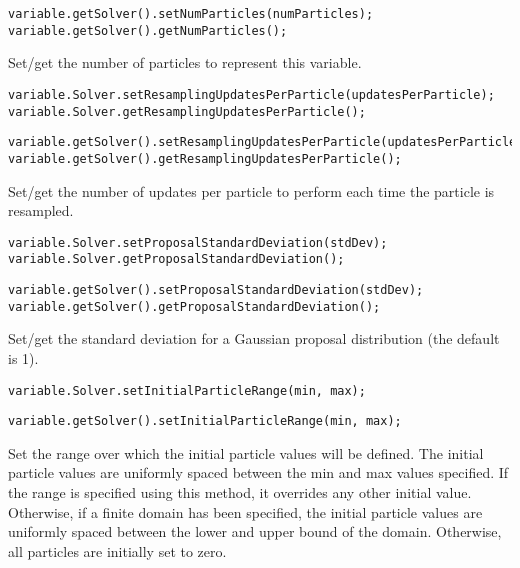\ifjava
\begin{lstlisting}
variable.getSolver().setNumParticles(numParticles);
variable.getSolver().getNumParticles();
\end{lstlisting}
\fi

Set/get the number of particles to represent this variable.

\ifmatlab
\begin{lstlisting}
variable.Solver.setResamplingUpdatesPerParticle(updatesPerParticle);
variable.Solver.getResamplingUpdatesPerParticle();
\end{lstlisting}
\fi

\ifjava
\begin{lstlisting}
variable.getSolver().setResamplingUpdatesPerParticle(updatesPerParticle);
variable.getSolver().getResamplingUpdatesPerParticle();
\end{lstlisting}
\fi


Set/get the number of updates per particle to perform each time the particle is resampled.

\ifmatlab
\begin{lstlisting}
variable.Solver.setProposalStandardDeviation(stdDev);
variable.Solver.getProposalStandardDeviation();
\end{lstlisting}
\fi

\ifjava
\begin{lstlisting}
variable.getSolver().setProposalStandardDeviation(stdDev);
variable.getSolver().getProposalStandardDeviation();
\end{lstlisting}
\fi


Set/get the standard deviation for a Gaussian proposal distribution (the default is 1).

\ifmatlab
\begin{lstlisting}
variable.Solver.setInitialParticleRange(min, max);
\end{lstlisting}
\fi

\ifjava
\begin{lstlisting}
variable.getSolver().setInitialParticleRange(min, max);
\end{lstlisting}
\fi

Set the range over which the initial particle values will be defined. The initial particle values are uniformly spaced between the min and max values specified. If the range is specified using this method, it overrides any other initial value. Otherwise, if a finite domain has been specified, the initial particle values are uniformly spaced between the lower and upper bound of the domain. Otherwise, all particles are initially set to zero.

